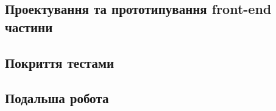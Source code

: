 \documentclass[a4paper,14pt]{extarticle} %
\begin{document}
\subsection{Проектування та прототипування front-end частини}





\subsection{Покриття тестами}




\subsection{Подальша робота}


\end{document}
